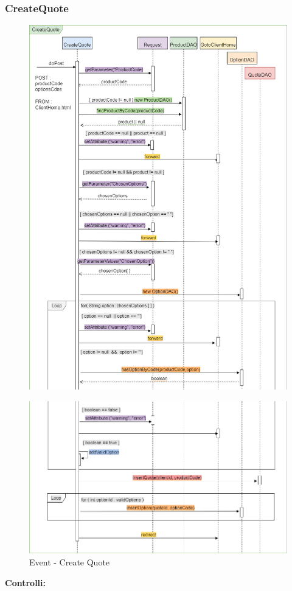\documentclass[a4paper, 12pt]{article}
\begin{document}
\subsubsection{CreateQuote}
\begin{figure}[h!]
	\centering
	\includegraphics[width=1\textwidth]{PureHTML_images/CreateQuote1.png}
	\label{figure:createquote1_sd}
\end{figure}
\newpage
\begin{figure}[h!]
	\centering
	\includegraphics[width=1\textwidth]{PureHTML_images/CreateQuote2.png}
	\caption{Event - Create Quote}
	\label{figure:createquote2_sd}
\end{figure}
\noindent \textbf{Controlli:}
\end{document}
